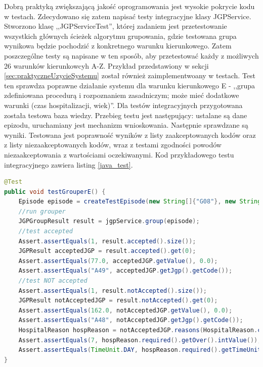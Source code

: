Dobrą praktyką zwiększającą jakość oprogramowania jest wysokie pokrycie kodu w testach. Zdecydowano się zatem napisać testy integracyjne klasy JGPService. Stworzono klasę ,,JGPServiceTest'', której zadaniem jest przetestowanie wszystkich głównych ścieżek algorytmu grupowania, gdzie testowana grupa wynikowa będzie pochodzić z konkretnego warunku kierunkowego. Zatem poszczególne testy są napisane w ten sposób, aby przetestować każdy z możliwych 26 warunków kierunkowcyh A-Z.
Przykład przedstawiony w sekcji \ref{sec:praktyczneUzycieSystemu} został również zaimplementwoany w testach. Test ten sprawdza poprawne działanie systemu dla warunku kierunkowego E - ,,grupa zdefiniowana procedurą i rozpoznaniem zasadniczym; może mieć dodatkowe warunki (czas hospitalizacji, wiek)''.
Dla testów integracyjnych przygotowana została testowa baza wiedzy. Przebieg testu jest następujący: ustalane są dane epizodu, uruchamiany jest mechanizm wnioskowania. Następnie sprawdzane są wyniki. Testowana jest poprawność wyników z listy zaakceptowanych kodów oraz z listy niezaakceptowanych kodów, wraz z testami zgodności powodów niezaakceptowania z wartościami oczekiwanymi.
Kod przykładowego testu integracyjnego zawiera listing \ref{java_test}.

\newpage
\begin{lstlisting}[language=Java,caption={Test integracyjny sprawdzający warunek kierunkowy ,,E''.},label=java_test]
@Test
public void testGrouperE() {
    Episode episode = createTestEpisode(new String[]{"G08"}, new String[]{"88.714"}, 7, 75);
    //run grouper
    JGPGroupResult result = jgpService.group(episode);
    //test accepted
    Assert.assertEquals(1, result.accepted().size());
    JGPResult acceptedJGP = result.accepted().get(0);
    Assert.assertEquals(77.0, acceptedJGP.getValue(), 0.0);
    Assert.assertEquals("A49", acceptedJGP.getJgp().getCode());
    //test NOT accepted
    Assert.assertEquals(1, result.notAccepted().size());
    JGPResult notAcceptedJGP = result.notAccepted().get(0);
    Assert.assertEquals(162.0, notAcceptedJGP.getValue(), 0.0);
    Assert.assertEquals("A48", notAcceptedJGP.getJgp().getCode());
    HospitalReason hospReason = notAcceptedJGP.reasons(HospitalReason.class).get(0);
    Assert.assertEquals(7, hospReason.required().getOver().intValue());
    Assert.assertEquals(TimeUnit.DAY, hospReason.required().getTimeUnit());
}
\end{lstlisting}

